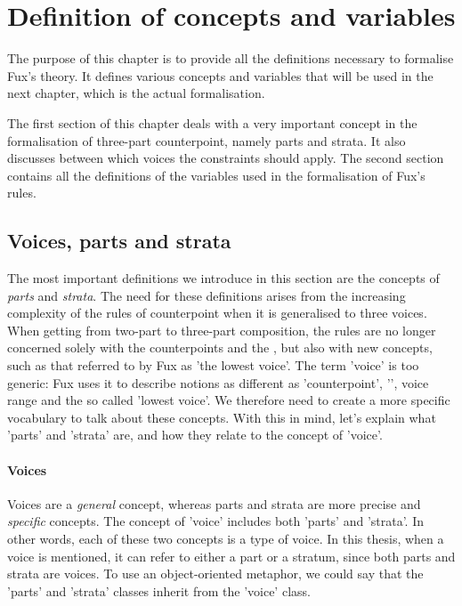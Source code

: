 \chapter{Definition of concepts and variables} \label{chapter:defining-some-concepts-and-redifing-the-variables}
The purpose of this chapter is to provide all the definitions necessary to formalise Fux's theory. It defines various concepts and variables that will be used in the next chapter, which is the actual formalisation. 

The first section of this chapter deals with a very important concept in the formalisation of three-part counterpoint, namely parts and strata. It also discusses between which voices the constraints should apply.
The second section contains all the definitions of the variables used in the formalisation of Fux's rules.

\section{Voices, parts and strata}\label{section:parts-and-strata}
The most important definitions we introduce in this section are the concepts of \textit{parts} and \textit{strata}. The need for these definitions arises from the increasing complexity of the rules of counterpoint when it is generalised to three voices. When getting from two-part to three-part composition, the rules are no longer concerned solely with the counterpoints and the \cf, but also with new concepts, such as that referred to by Fux as 'the lowest voice'. The term 'voice' is too generic: Fux uses it to describe notions as different as 'counterpoint', '\cf', voice range and the so called 'lowest voice'. We therefore need to create a more specific vocabulary to talk about these concepts.
With this in mind, let's explain what 'parts' and 'strata' are, and how they relate to the concept of 'voice'.

\subsubsection{Voices} Voices are a \textit{general} concept, whereas parts and strata are more precise and \textit{specific} concepts. The concept of 'voice' includes both 'parts' and 'strata'. In other words, each of these two concepts is a type of voice. In this thesis, when a voice is mentioned, it can refer to either a part or a stratum, since both parts and strata are voices. To use an object-oriented metaphor, we could say that the 'parts' and 'strata' classes inherit from the 'voice' class.

